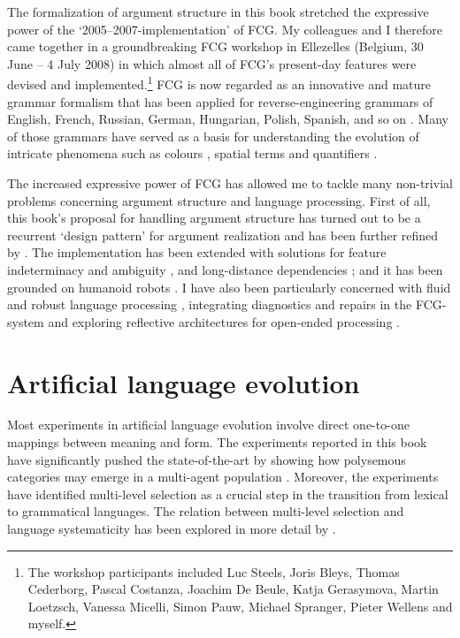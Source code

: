 The formalization of argument structure in this book stretched the expressive power of the `2005--2007-implementation' of FCG. My colleagues and I therefore came together in a groundbreaking FCG workshop in Ellezelles (Belgium, 30 June -- 4 July 2008) in which almost all of FCG's present-day features were devised and implemented.\footnote{The workshop participants included Luc Steels, Joris Bleys, Thomas Cederborg, Pascal Costanza, Joachim De Beule, Katja Gerasymova, Martin Loetzsch, Vanessa Micelli, Simon Pauw, Michael Spranger, Pieter Wellens and myself.} FCG is now regarded as an innovative and mature grammar formalism \citep{vantrijp13comparison} that has been applied for reverse-engineering grammars of English, French, Russian, German, Hungarian, Polish, Spanish, and so on \citep{steels11design,steels12computational,steels12language}. Many of those grammars have served as a basis for understanding the evolution of intricate phenomena such as colours \citep{bleys10}, spatial terms \citep{spranger:11b} and quantifiers \citep{pauw13}.

The increased expressive power of FCG has allowed me to tackle many non-trivial problems concerning argument structure and language processing. First of all, this book's proposal for handling argument structure has turned out to be a recurrent `design pattern' for argument realization and has been further refined by \citet{vantrijp11design}. The implementation has been extended with solutions for feature indeterminacy and ambiguity \citep{vantrijp11feature}, and long-distance dependencies \citep{vantrijp14}; and it has been grounded on humanoid robots \citep{steels12action}. I have also been particularly concerned with fluid and robust language processing \citep{steels11how}, integrating diagnostics and repairs in the FCG-system \citep{beuls12diagnostics} and exploring reflective architectures for open-ended processing \citep{vantrijp12robust}.

\section*{Artificial language evolution}

Most experiments in artificial language evolution involve direct one-to-one mappings between meaning and form. The experiments reported in this book have significantly pushed the state-of-the-art by showing how polysemous categories may emerge in a multi-agent population \citep[for more recent results, see][]{vantrijp10grammaticalization,vantrijp:11a,vantrijp12b,vantrijp12case}. Moreover, the experiments have identified multi-level selection as a crucial step in the transition from lexical to grammatical languages. The relation between multi-level selection and language systematicity has been explored in more detail by \citet{vantrijp:12f}.

